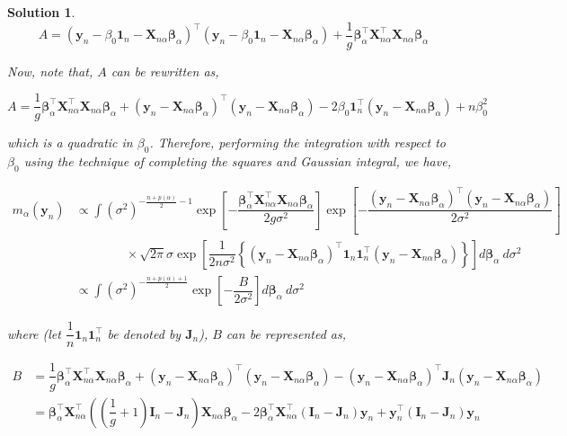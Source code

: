 \documentclass[12pt]{article}
\theoremstyle{problemstyle}
\newtheorem*{solution*}{Solution}
\newcommand{\bb}[1]{\boldsymbol{#1}}
\newcommand{\transpose}{^\intercal}
\begin{document}
\begin{solution*}
    $$
    A = (\bb{y}_n - \beta_0 \bb{1}_n - \bb{X}_{n\alpha} \bb{\beta}_{\alpha})\transpose (\bb{y}_n - \beta_0 \bb{1}_n - \bb{X}_{n\alpha} \bb{\beta}_{\alpha}) + \dfrac{1}{g} \bb{\beta}_\alpha\transpose \bb{X}_{n\alpha}\transpose \bb{X}_{n\alpha} \bb{\beta}_\alpha
    $$

    Now, note that, $A$ can be rewritten as,

    $$
    A = \dfrac{1}{g} \bb{\beta}_\alpha\transpose \bb{X}_{n\alpha}\transpose \bb{X}_{n\alpha} \bb{\beta}_\alpha + (\bb{y}_n - \bb{X}_{n\alpha}\bb{\beta}_\alpha)\transpose (\bb{y}_n - \bb{X}_{n\alpha}\bb{\beta}_\alpha) - 2 \beta_0 \bb{1}_n\transpose (\bb{y}_n - \bb{X}_{n\alpha}\bb{\beta}_\alpha) + n\beta_0^2 
    $$

    which is a quadratic in $\beta_0$. Therefore, performing the integration with respect to $\beta_0$ using the technique of completing the squares and Gaussian integral, we have,

    \begin{align*}
        m_\alpha(\bb{y}_n)
        & \propto \int (\sigma^2)^{-\frac{n + p(\alpha)}{2} - 1} \exp\left[ -\dfrac{\bb{\beta}_\alpha\transpose \bb{X}_{n\alpha}\transpose \bb{X}_{n\alpha} \bb{\beta}_\alpha}{2g\sigma^2} \right] \exp\left[ -\dfrac{(\bb{y}_n - \bb{X}_{n\alpha}\bb{\beta}_\alpha)\transpose (\bb{y}_n - \bb{X}_{n\alpha}\bb{\beta}_\alpha)}{2\sigma^2} \right] \\
        & \qquad \qquad \times \sqrt{2\pi}\sigma \exp\left[ \dfrac{1}{2n\sigma^2} \left\{ (\bb{y}_n - \bb{X}_{n\alpha}\bb{\beta}_\alpha)\transpose \bb{1}_n \bb{1}_n\transpose (\bb{y}_n - \bb{X}_{n\alpha}\bb{\beta}_\alpha) \right\} \right] d\bb{\beta}_\alpha \ d\sigma^2\\
        & \propto \int (\sigma^2)^{-\frac{n + p(\alpha) + 1}{2}} \exp\left[ -\dfrac{B}{2\sigma^2} \right] d\bb{\beta}_\alpha \ d\sigma^2
    \end{align*}

    where (let $\dfrac{1}{n}\bb{1}_n \bb{1}_n\transpose$ be denoted by $\bb{J}_n$), $B$ can be represented as, 

    \begin{align*}
        B
        & = \dfrac{1}{g} \bb{\beta}_\alpha\transpose \bb{X}_{n\alpha}\transpose \bb{X}_{n\alpha} \bb{\beta}_\alpha + (\bb{y}_n - \bb{X}_{n\alpha}\bb{\beta}_\alpha)\transpose (\bb{y}_n - \bb{X}_{n\alpha}\bb{\beta}_\alpha) - (\bb{y}_n - \bb{X}_{n\alpha}\bb{\beta}_\alpha)\transpose \bb{J}_n (\bb{y}_n - \bb{X}_{n\alpha}\bb{\beta}_\alpha)\\
        & = \bb{\beta}_\alpha \transpose \bb{X}_{n\alpha}\transpose \left( \left( \dfrac{1}{g} + 1 \right)\bb{I}_n - \bb{J}_n \right) \bb{X}_{n\alpha}\bb{\beta}_\alpha - 2 \bb{\beta}_\alpha\transpose \bb{X}_{n\alpha}\transpose (\bb{I}_n - \bb{J}_n) \bb{y}_n + \bb{y}_n \transpose (\bb{I}_n - \bb{J}_n) \bb{y}_n
    \end{align*}


\end{solution*}
\end{document}
